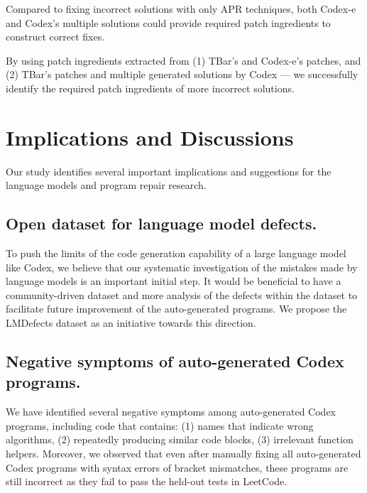 Compared to fixing incorrect solutions with only APR techniques, both Codex-e and Codex's multiple solutions could provide required patch ingredients to construct correct fixes.

\begin{tcolorbox}[left=2pt,right=2pt,top=2pt,bottom=2pt]

By using patch ingredients extracted from (1) TBar's and Codex-e's patches, and (2) TBar's patches and multiple generated solutions by Codex --- we successfully identify the required patch ingredients of more incorrect solutions.

\end{tcolorbox}

\section{Implications and Discussions} Our study identifies several important implications and suggestions for the language models and program repair research.

\subsection{Open dataset for language model defects.} To push the limits of the code generation capability of a large language model like Codex, we believe that our systematic investigation of the mistakes made by language models is an important initial step. It would be beneficial to have a community-driven dataset and more analysis of the defects within the dataset to facilitate future improvement of the auto-generated programs. We propose the LMDefects dataset as an initiative towards this direction. 

\subsection{Negative symptoms of auto-generated Codex programs.}  We have identified several negative symptoms among auto-generated Codex programs, including code that contains: (1) names that indicate wrong algorithms, (2) repeatedly producing similar code blocks, (3) irrelevant function helpers. Moreover, we observed that even after manually fixing all auto-generated Codex programs with syntax errors of bracket mismatches, these programs are still incorrect as they fail to pass the held-out tests in LeetCode. 

